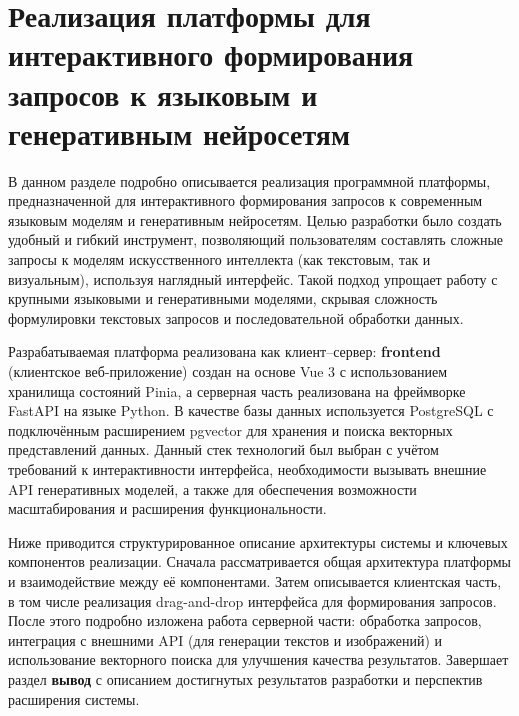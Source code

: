 \section{Реализация платформы для интерактивного формирования запросов к языковым и генеративным нейросетям}

В данном разделе подробно описывается реализация программной платформы, предназначенной для интерактивного формирования запросов к современным языковым моделям и генеративным нейросетям. Целью разработки было создать удобный и гибкий инструмент, позволяющий пользователям составлять сложные запросы к моделям искусственного интеллекта (как текстовым, так и визуальным), используя наглядный интерфейс. Такой подход упрощает работу с крупными языковыми и генеративными моделями, скрывая сложность формулировки текстовых запросов \cite{lakera:2025} и последовательной обработки данных.

Разрабатываемая платформа реализована как клиент--сервер: \textbf{frontend} (клиентское веб-приложение) создан на основе Vue 3 с использованием хранилища состояний Pinia, а серверная часть реализована на фреймворке FastAPI на языке Python\cite{fastapi:practicum}. В качестве базы данных используется PostgreSQL с подключённым расширением pgvector для хранения и поиска векторных представлений данных. Данный стек технологий был выбран с учётом требований к интерактивности интерфейса, необходимости вызывать внешние API генеративных моделей, а также для обеспечения возможности масштабирования и расширения функциональности.

Ниже приводится структурированное описание архитектуры системы и ключевых компонентов реализации. Сначала рассматривается общая архитектура платформы и взаимодействие между её компонентами. Затем описывается клиентская часть, в том числе реализация drag-and-drop интерфейса для формирования запросов. После этого подробно изложена работа серверной части: обработка запросов, интеграция с внешними API (для генерации текстов и изображений) и использование векторного поиска для улучшения качества результатов. Завершает раздел \textbf{вывод} с описанием достигнутых результатов разработки и перспектив расширения системы.

